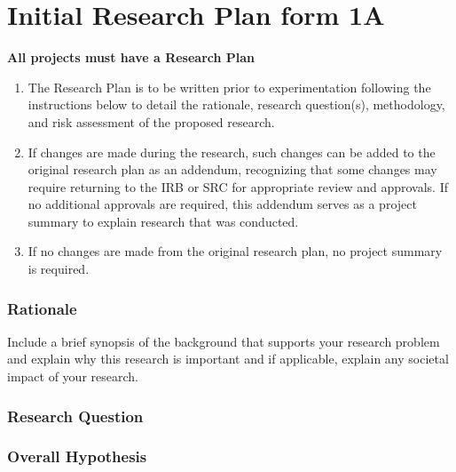\part{Initial Research Plan form 1A}

\textbf{All projects must have a Research Plan}
\begin{enumerate}[label=\Alph*.]
    \item The Research Plan is to be written prior to experimentation following the instructions below to detail the rationale, research question(s), methodology, and risk assessment of the proposed research.
    \item If changes are made during the research, such changes can be added to the original research plan as an addendum, recognizing that some changes may require returning to the IRB or SRC for appropriate review and approvals. If no additional approvals are required, this addendum serves as a project summary to explain research that was conducted.
    \item If no changes are made from the original research plan, no project summary is required.
\end{enumerate}


\section{Rationale}

Include a brief synopsis of the background that supports your research problem and explain why this research is important and if applicable, explain any societal impact of your research.

\begin{field}
  
\end{field}

\section{Research Question}

\begin{field}
\end{field}

\section{Overall Hypothesis}

